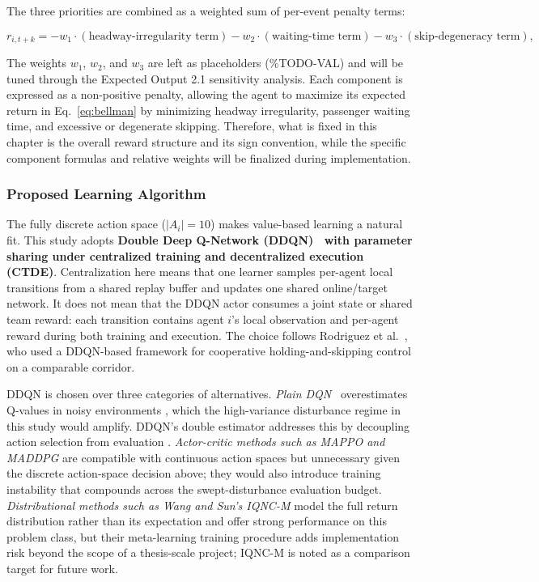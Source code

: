 The three priorities are combined as a weighted sum of per-event penalty terms:

\begin{equation}
r_{i,t+k} = -w_1 \cdot (\text{headway-irregularity term}) - w_2 \cdot (\text{waiting-time term}) - w_3 \cdot (\text{skip-degeneracy term}),
\label{eq:reward-form}
\end{equation}

The weights $w_1$, $w_2$, and $w_3$ are left as placeholders (\%TODO-VAL) and will be tuned through the Expected Output 2.1 sensitivity analysis. Each component is expressed as a non-positive penalty, allowing the agent to maximize its expected return in Eq.~\eqref{eq:bellman} by minimizing headway irregularity, passenger waiting time, and excessive or degenerate skipping. Therefore, what is fixed in this chapter is the overall reward structure and its sign convention, while the specific component formulas and relative weights will be finalized during implementation.

\subsubsection{Proposed Learning Algorithm}
\label{subsec:proposed-algorithm}

The fully discrete action space ($|A_i| = 10$) makes value-based learning a natural fit. This study adopts \textbf{Double Deep Q-Network (DDQN)~\cite{vanHasselt2016DDQN} with parameter sharing under centralized training and decentralized execution (CTDE)}. Centralization here means that one learner samples per-agent local transitions from a shared replay buffer and updates one shared online/target network. It does not mean that the DDQN actor consumes a joint state or shared team reward: each transition contains agent $i$'s local observation and per-agent reward during both training and execution. The choice follows Rodriguez et al.~\cite{Rodriguez2023Cooperative}, who used a DDQN-based framework for cooperative holding-and-skipping control on a comparable corridor.

DDQN is chosen over three categories of alternatives. \textit{Plain DQN}~\cite{Mnih2015DQN} overestimates Q-values in noisy environments \cite{vanHasselt2016DDQN,Henderson2018Matters}, which the high-variance disturbance regime in this study would amplify. DDQN's double estimator addresses this by decoupling action selection from evaluation \cite{vanHasselt2016DDQN}. \textit{Actor-critic methods such as MAPPO and MADDPG} are compatible with continuous action spaces but unnecessary given the discrete action-space decision above; they would also introduce training instability that compounds across the swept-disturbance evaluation budget. \textit{Distributional methods such as Wang and Sun's IQNC-M} \cite{Wangsun} model the full return distribution rather than its expectation and offer strong performance on this problem class, but their meta-learning training procedure adds implementation risk beyond the scope of a thesis-scale project; IQNC-M is noted as a comparison target for future work.

